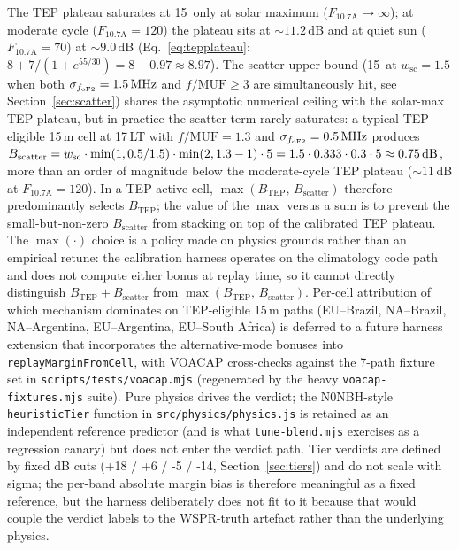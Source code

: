 \documentclass[11pt,a4paper]{article}
\newcommand{\SI}[2]{#1\,\text{#2}}
\newcommand{\dB}{\text{dB}}
\newcommand{\MHz}{\text{MHz}}
\begin{document}
The TEP plateau saturates at \SI{15}{\dB} only at solar maximum
($F_{10.7\text{A}} \to \infty$); at moderate cycle ($F_{10.7\text{A}}
= 120$) the plateau sits at $\sim\!11.2$\,dB and at quiet sun
($F_{10.7\text{A}} = 70$) at $\sim\!9.0$\,dB
(Eq.~\ref{eq:tepplateau}: $8 + 7/(1 + e^{55/30}) = 8 + 0.97 \approx 8.97$).  The scatter upper bound
(\SI{15}{\dB} at $w_{\text{sc}} = 1.5$ when both
$\sigma_{f_{\text{oF2}}} = \SI{1.5}{\MHz}$ and $f / \text{MUF} \ge
3$ are simultaneously hit, see Section~\ref{sec:scatter}) shares
the asymptotic numerical ceiling with the solar-max TEP plateau,
but in practice the scatter term rarely saturates: a typical
TEP-eligible 15\,m
cell at 17\,LT with $f / \text{MUF} = 1.3$ and
$\sigma_{f_{\text{oF2}}} = \SI{0.5}{\MHz}$ produces
$B_{\text{scatter}} = w_{\text{sc}} \cdot \min(1, 0.5/1.5) \cdot
\min(2, 1.3 - 1) \cdot 5
= 1.5 \cdot 0.333 \cdot 0.3 \cdot 5
\approx \SI{0.75}{\dB}$, more than an order of magnitude below
the moderate-cycle TEP plateau (${\sim}11$\,dB at
$F_{10.7\text{A}} = 120$).  In a TEP-active
cell, $\max(B_{\text{TEP}},\,B_{\text{scatter}})$ therefore
predominantly selects $B_{\text{TEP}}$; the value of the $\max$
versus a sum is to prevent the small-but-non-zero $B_{\text{scatter}}$
from stacking on top of the calibrated TEP plateau.  The
$\max(\cdot)$ choice is a policy made on physics grounds rather
than an empirical retune: the calibration harness operates on the
climatology code path and does not compute either bonus at replay
time, so it cannot directly distinguish $B_{\text{TEP}} +
B_{\text{scatter}}$ from $\max(B_{\text{TEP}},\,B_{\text{scatter}})$.
Per-cell attribution of which mechanism dominates on TEP-eligible
15\,m paths (EU--Brazil, NA--Brazil, NA--Argentina, EU--Argentina,
EU--South Africa) is deferred to a future harness extension that
incorporates the alternative-mode bonuses into
\texttt{replayMarginFromCell}, with VOACAP cross-checks against
the 7-path fixture set in \texttt{scripts/tests/voacap.mjs}
(regenerated by the heavy \texttt{voacap-fixtures.mjs} suite).
Pure physics drives the verdict; the N0NBH-style
\texttt{heuristicTier} function in \texttt{src/physics/physics.js}
is retained as an independent reference predictor (and is what
\texttt{tune-blend.mjs} exercises as a regression canary) but
does not enter the verdict path.  Tier verdicts are defined by
fixed dB cuts (+18 / +6 / -5 / -14, Section~\ref{sec:tiers}) and
do not scale with sigma; the per-band absolute margin bias is
therefore meaningful as a fixed reference, but the harness
deliberately does not fit to it because that would couple the
verdict labels to the WSPR-truth artefact rather than the
underlying physics.
\end{document}
